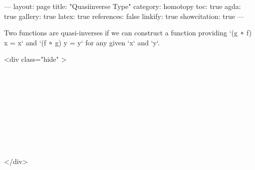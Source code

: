 ---
layout: page
title: "Quasiinverse Type"
category: homotopy
toc: true
agda: true
gallery: true
latex: true
references: false
linkify: true
showcitation: true
---

Two functions are quasi-inverses if we can construct a function providing
`(g ∘ f) x = x` and `(f ∘ g) y = y` for any given `x` and `y`.

<div class="hide" >
\begin{code}%
\>[0]\AgdaSymbol{\{-\#}\AgdaSpace{}%
\AgdaSpace{}%
\AgdaSpace{}%
\AgdaSymbol{\#-\}}\<%
\\
\>[0]\AgdaSpace{}%
\AgdaSpace{}%
\<%
\\
\>[0]\AgdaSpace{}%
\AgdaSpace{}%
\<%
\\
%
\\[\AgdaEmptyExtraSkip]%
\>[0]\AgdaSpace{}%
\AgdaSpace{}%
\<%
\\
\>[0]\AgdaSpace{}%
\AgdaSpace{}%
\<%
\\
%
\\[\AgdaEmptyExtraSkip]%
%
\\[\AgdaEmptyExtraSkip]%
\>[0]\AgdaSpace{}%
\AgdaSpace{}%
\<%
\end{code}
</div>

\begin{code}%
\>[0]\AgdaSpace{}%
\AgdaSpace{}%
\AgdaSymbol{\{}\AgdaSpace{}%
\AgdaSymbol{:}\AgdaSpace{}%
\AgdaSpace{}%
\AgdaSymbol{\}}\AgdaSpace{}%
\AgdaSymbol{\{}\AgdaSpace{}%
\AgdaSymbol{:}\AgdaSpace{}%
\AgdaSpace{}%
\AgdaSymbol{\}}\AgdaSpace{}%
\<%
\end{code}

